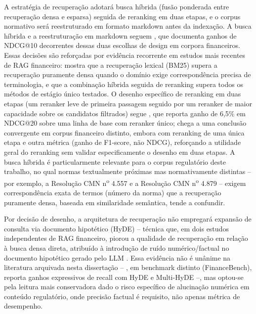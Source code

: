 A estrat\'egia de recupera\c{c}\~ao adotar\'a busca h\'ibrida (fus\~ao
ponderada entre recupera\c{c}\~ao densa e esparsa) seguida de reranking
em duas etapas, e o corpus normativo ser\'a reestruturado em formato
markdown antes da indexa\c{c}\~ao. A busca h\'ibrida e a
reestrutura\c{c}\~ao em markdown seguem \textcite{kim2025}, que
documenta ganhos de NDCG@10 decorrentes dessas duas escolhas de design
em corpora financeiros. Essas decis\~oes s\~ao refor\c{c}adas por
evid\^encia recorrente em estudos mais recentes de RAG financeiro:
\textcite{akarsu2026} mostra que a recupera\c{c}\~ao lexical (BM25)
supera a recupera\c{c}\~ao puramente densa quando o dom\'inio exige
correspond\^encia precisa de terminologia, e que a combina\c{c}\~ao
h\'ibrida seguida de reranking supera todos os m\'etodos de est\'agio
\'unico testados. O desenho espec\'ifico de reranking em duas etapas
(um reranker leve de primeira passagem seguido por um reranker de maior
capacidade sobre os candidatos filtrados) segue \textcite{lee2026}, que
reporta ganho de 6,5\% em NDCG@20 sobre uma linha de base com reranker
\'unico; \textcite{dadopoulos2025} chega a uma conclus\~ao convergente
em corpus financeiro distinto, embora com reranking de uma \'unica etapa
e outra m\'etrica (ganho de F1-score, n\~ao NDCG), refor\c{c}ando a
utilidade geral do reranking sem validar especificamente o desenho em
duas etapas. A busca h\'ibrida \'e
particularmente relevante para o corpus regulat\'orio deste trabalho, no
qual normas textualmente pr\'oximas mas normativamente distintas -- por
exemplo, a Resolu\c{c}\~ao CMN n\textsuperscript{o} 4.557 e a
Resolu\c{c}\~ao CMN n\textsuperscript{o} 4.879 -- exigem correspond\^encia
exata de termos (n\'umero da norma) que a recupera\c{c}\~ao puramente
densa, baseada em similaridade sem\^antica, tende a confundir.

Por decis\~ao de desenho, a arquitetura de recupera\c{c}\~ao n\~ao
empregar\'a expans\~ao de consulta via documento hipot\'etico (HyDE) --
t\'ecnica que, em dois estudos independentes de RAG financeiro, piorou
a qualidade de recupera\c{c}\~ao em rela\c{c}\~ao \`a busca densa
direta, atribu\'ido \`a introdu\c{c}\~ao de ru\'ido num\'erico/factual
no documento hipot\'etico gerado pelo LLM \autocite{akarsu2026,lee2026}.
Essa evid\^encia n\~ao \'e un\^anime na literatura arquivada nesta
disserta\c{c}\~ao -- \textcite{kobeissi2026}, em benchmark distinto
(FinanceBench), reporta ganhos expressivos de recall com HyDE e
Multi-HyDE --, mas optou-se pela leitura mais conservadora dado o risco
espec\'ifico de alucina\c{c}\~ao num\'erica em conte\'udo regulat\'orio,
onde precis\~ao factual \'e requisito, n\~ao apenas m\'etrica de
desempenho.

